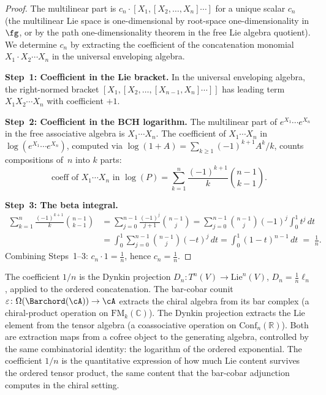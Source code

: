 \begin{proof}
The multilinear part is $c_n\cdot[X_1,[X_2,\ldots,X_n]\cdots]$ for a
unique scalar $c_n$ (the multilinear Lie space is one-dimensional by
root-space one-dimensionality in $\fg$, or by the path
one-dimensionality theorem in the free Lie algebra quotient). We
determine $c_n$ by extracting the coefficient of the concatenation
monomial $X_1\cdot X_2\cdots X_n$ in the universal enveloping algebra.

\medskip\noindent\textbf{Step~1: Coefficient in the Lie bracket.}
In the universal enveloping algebra, the right-normed bracket
$[X_1,[X_2,\ldots,[X_{n-1},X_n]\cdots]]$ has leading term
$X_1 X_2\cdots X_n$ with coefficient $+1$.

\medskip\noindent\textbf{Step~2: Coefficient in the BCH logarithm.}
The multilinear part of $e^{X_1}\cdots e^{X_n}$ in the free
associative algebra is $X_1\cdots X_n$. The coefficient of
$X_1\cdots X_n$ in $\log(e^{X_1}\cdots e^{X_n})$, computed via
$\log(1+A)=\sum_{k\ge 1}(-1)^{k+1}A^k/k$, counts compositions
of~$n$ into $k$ parts:
\[
\text{coeff of }X_1\cdots X_n\text{ in }\log(P)
=
\sum_{k=1}^{n}\frac{(-1)^{k+1}}{k}\binom{n-1}{k-1}.
\]

\medskip\noindent\textbf{Step~3: The beta integral.}
\begin{align*}
\sum_{k=1}^{n}\frac{(-1)^{k+1}}{k}\binom{n-1}{k-1}
&=
\sum_{j=0}^{n-1}\frac{(-1)^{j}}{j+1}\binom{n-1}{j}
=
\sum_{j=0}^{n-1}\binom{n-1}{j}(-1)^j\int_0^1 t^j\,dt\\
&=
\int_0^1\sum_{j=0}^{n-1}\binom{n-1}{j}(-t)^j\,dt
=
\int_0^1(1-t)^{n-1}\,dt
\;=\;\frac{1}{n}.
\end{align*}
Combining Steps~1--3: $c_n\cdot 1=\frac{1}{n}$, hence
$c_n=\frac{1}{n}$.
\end{proof}

\begin{remark}
The coefficient $1/n$ is the Dynkin projection
$D_n\colon T^n(V)\to\mathrm{Lie}^n(V)$,
$D_n=\frac{1}{n}\ell_n$, applied to the ordered concatenation.
The bar-cobar counit $\varepsilon\colon\Omega(\Barchord(\cA))\to\cA$
extracts the chiral algebra from its bar complex (a chiral-product
operation on $\mathrm{FM}_k(\mathbb{C})$). The Dynkin projection
extracts the Lie element from the tensor algebra (a coassociative
operation on $\mathrm{Conf}_n(\mathbb{R})$). Both are extraction
maps from a cofree object to the generating algebra, controlled
by the same combinatorial identity: the logarithm of the ordered
exponential. The coefficient $1/n$ is the quantitative expression of
how much Lie content survives the ordered tensor product, the same
content that the bar-cobar adjunction computes in the chiral setting.
\end{remark}

